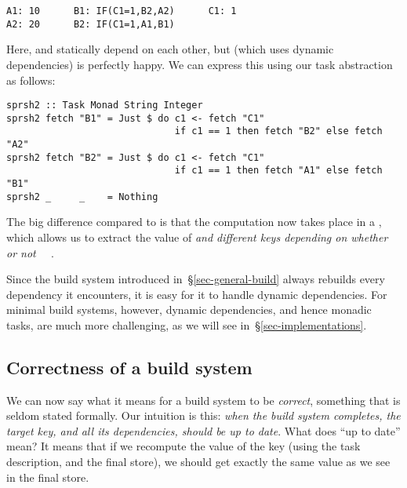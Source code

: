 \vspace{1mm}
\begin{verbatim}
A1: 10      B1: IF(C1=1,B2,A2)      C1: 1
A2: 20      B2: IF(C1=1,A1,B1)
\end{verbatim}

\noindent
Here,  and  statically depend on each other, but \Excel (which
uses dynamic dependencies) is perfectly happy. We can express this using
our task abstraction as follows:


\vspace{1mm}
\begin{verbatim}
sprsh2 :: Task Monad String Integer
sprsh2 fetch "B1" = Just $ do c1 <- fetch "C1"
                              if c1 == 1 then fetch "B2" else fetch "A2"
sprsh2 fetch "B2" = Just $ do c1 <- fetch "C1"
                              if c1 == 1 then fetch "A1" else fetch "B1"
sprsh2 _     _    = Nothing
\end{verbatim}
\vspace{1mm}

\noindent
The big difference compared to  is that the computation now takes
place in a , which allows us to extract the value of  \emph{and
 different keys depending on whether or not ~\hs{==}~}.

Since the  build system introduced in~\S\ref{sec-general-build} always
rebuilds every dependency it encounters, it is easy for it to handle dynamic
dependencies. For minimal build systems, however, dynamic dependencies, and hence
monadic tasks, are much more challenging, as we will see
in~\S\ref{sec-implementations}.

\subsection{Correctness of a build system} \label{sec-build-correctness}

We can now say what it means for a build system to be \emph{correct}, something
that is seldom stated formally. Our intuition is this: \emph{when the build
system completes, the target key, and all its dependencies, should be up to
date}. What does ``up to date'' mean? It means that if we recompute the value of
the key (using the task description, and the final store), we should get exactly
the same value as we see in the final store.

